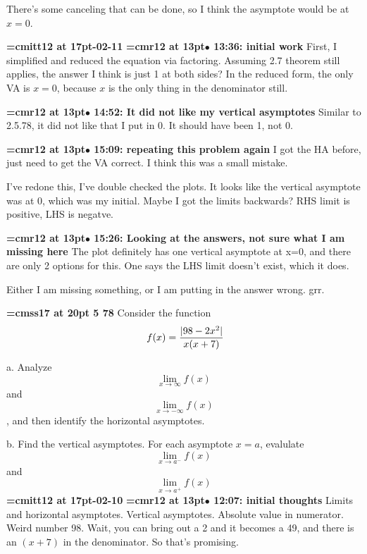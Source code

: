There's some canceling that can be done, so I think the asymptote would be at $x = 0$.
\par

{\medskip\noindent\bf\font\titlefont=cmitt12 at 17pt-02-11}\medskip
{\smallskip\noindent\bf\font\titlefont=cmr12 at 13pt\titlefont $\bullet$ 13:36: initial work}\smallskip
First, I simplified and reduced the equation via factoring. Assuming 2.7 theorem still applies, the answer I think is just 1 at both sides? In the reduced form, the only VA is $x = 0$, because $x$ is the only thing in the denominator still.
\par

{\smallskip\noindent\bf\font\titlefont=cmr12 at 13pt\titlefont $\bullet$ 14:52: It did not like my vertical asymptotes}\smallskip
Similar to 2.5.78, it did not like that I put in 0. It should have been 1, not 0.
\par

{\smallskip\noindent\bf\font\titlefont=cmr12 at 13pt\titlefont $\bullet$ 15:09: repeating this problem again}\smallskip
I got the HA before, just need to get the VA correct. I think this was a small mistake.
\par

I've redone this, I've double checked the plots. It looks like the vertical asymptote was at 0, which was my initial. Maybe I got the limits backwards? RHS limit is positive, LHS is negatve.
\par

{\smallskip\noindent\bf\font\titlefont=cmr12 at 13pt\titlefont $\bullet$ 15:26: Looking at the answers, not sure what I am missing here}\smallskip
The plot definitely has one vertical asymptote at x=0, and there are only 2 options for this. One says the LHS limit doesn't exist, which it does.
\par

Either I am missing something, or I am putting in the answer wrong. grr.
\par

{\medskip\noindent\bf\font\titlefont=cmss17 at 20pt 5 78}\medskip
Consider the function
$$\
f(x) = {
|98 - 2x^2|
\over
x(x + 7)
}
$$
\par a. Analyze $$\lim_{x \to \infty}{f(x)}$$ and
$$\lim_{x \to -\infty}{f(x)}$$, and then identify the horizontal
asymptotes.
\par b. Find the vertical asymptotes. For each asymptote $x = a$,
evalulate $$\lim_{x \to a^{-}}{f(x)}$$ and $$\lim_{x \to a^{+}}{f(x)}$$
{\medskip\noindent\bf\font\titlefont=cmitt12 at 17pt\titlefont 2026-02-10}\medskip
{\smallskip\noindent\bf\font\titlefont=cmr12 at 13pt\titlefont $\bullet$ 12:07: initial thoughts}\smallskip
Limits and horizontal asymptotes. Vertical asymptotes. Absolute value in numerator. Weird number 98. Wait, you can bring out a 2 and it becomes a 49, and there is an $(x + 7)$ in the denominator. So that's promising.
\par

